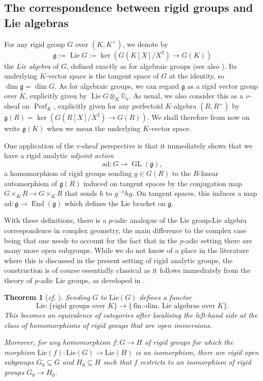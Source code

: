 \documentclass[11pt]{amsart}
\numberwithin{equation}{section}
\newtheorem{Theorem}[thm]{Theorem}
\theoremstyle{definition}
\theoremstyle{remark}
\newcommand{\lra}{\longrightarrow}
\newcommand{\G}{\mathbb{G}}
\newcommand{\mg}{\mathfrak{g}}
\newcommand{\End}{\operatorname{End}}
\newcommand{\GL}{\operatorname{GL}}
\newcommand{\Perf}{\operatorname{Perf}}
\newcommand{\ad}{\mathrm{ad}}
\begin{document}
\subsection{The correspondence between rigid groups and Lie algebras}

For any rigid group $G$ over $(K,K^+)$, we denote by 
\[\mathfrak g:=\operatorname{Lie} G:=\ker\left(G(K[X]/X^2)\to G(K)\right)\]
the \emph{Lie algebra} of $G$, defined exactly as for algebraic groups (see also \cite[Section~1.2]{Fargues-groupes-analytiques}). Its underlying $K$-vector space is the tangent space of $G$ at the identity, so $\dim \mathfrak g=\dim G$. As for algebraic groups, we can  regard $\mathfrak g$ as a rigid vector group over $K$, explicitly given by $\operatorname{Lie} G\otimes_K \G_a$. As usual, we also consider this as a $v$-sheaf on $\Perf_K$, explicitly given for any perfectoid $K$-algebra $(R,R^+)$ by $\mathfrak g(R)=\ker(G(R[X]/X^2)\to G(R))$.
We shall therefore from now on write $\mathfrak g(K)$ when we mean the underlying $K$-vector space. 

One application of the $v$-sheaf perspective is that it immediately shows that we have a rigid analytic \emph{adjoint action}
\[ \ad\colon G\lra \GL(\mathfrak g),\]
a homomorphism of rigid groups sending $g\in G(R)$ to the $R$-linear automorphism of $\mathfrak g(R)$ induced on tangent spaces by the conjugation map $G\times_KR\to G\times_KR$ that sends $h$ to $g^{-1}hg$. On tangent spaces, this induces a map $\ad\colon \mg\to \End(\mathfrak g)$ which defines the Lie bracket on $\mg$.

\medskip

With these definitions, there is a $p$-adic analogue of the Lie group-Lie algebra correspondence in complex geometry,  the main difference to the complex case being that one needs to account for the fact that in the $p$-adic setting there are many more open subgroups.  While we do not know of a place in the literature where this is discussed in the present setting of rigid analytic groups, the construction is of course essentially classical as it follows immediately from the theory of $p$-adic Lie groups, as developed in \cite{Bourbaki-Lie,Serre_Lie,Schneider_Lie}. 

\begin{Theorem}[\textit{cf.} {\cite[Part~II]{Serre_Lie}}]\label{t:Lie-grp-Lie-alg-correspondence}
	Sending $G$ to $\mathrm{Lie}(G)$ defines a functor
	\[ \mathrm{Lie}\colon \{  \text{rigid groups over $K$}\}\lra \{\,\text{fin.-dim.\ Lie algebras over $K$}\}.\]
	This
	 becomes an equivalence of categories after localising the left-hand side at the class of homomorphisms of rigid groups that are open immersions.
	
	Moreover, for any homomorphism  $f\colon G\to H$ of rigid groups for which the morphism $\mathrm{Lie}(f)\colon \mathrm{Lie}(G)\to \mathrm{Lie}(H)$ is an isomorphism, there are rigid open subgroups $G_0\subseteq G$ and $H_0\subseteq H$ such that $f$ restricts to an isomorphism of rigid groups $G_0\to H_0$.
\end{Theorem}
\end{document}
